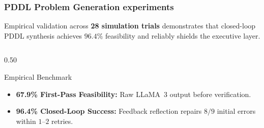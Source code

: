 \documentclass[10pt]{beamer}
\begin{document}
\begin{frame}[t]
    \frametitle{PDDL Problem Generation experiments}
    \footnotesize
    Empirical validation across \textbf{28 simulation trials} demonstrates that closed-loop PDDL synthesis achieves $96.4\%$ feasibility and reliably shields the executive layer.

    \vspace{0.08cm}
    \begin{columns}[T]
        \begin{column}{0.50\textwidth}
            \begin{block}{Empirical Benchmark}
                \centering
                \vspace{0.05cm}
                \vspace{0.06cm}
                \begin{itemize}\scriptsize
                    \item \textbf{67.9\% First-Pass Feasibility:} Raw LLaMA~3 output before verification.
                    \item \textbf{96.4\% Closed-Loop Success:} Feedback reflection repairs $8/9$ initial errors within $1$--$2$ retries.
                \end{itemize}
            \end{block}
        \end{column}


\end{columns}
\end{frame}
\end{document}
